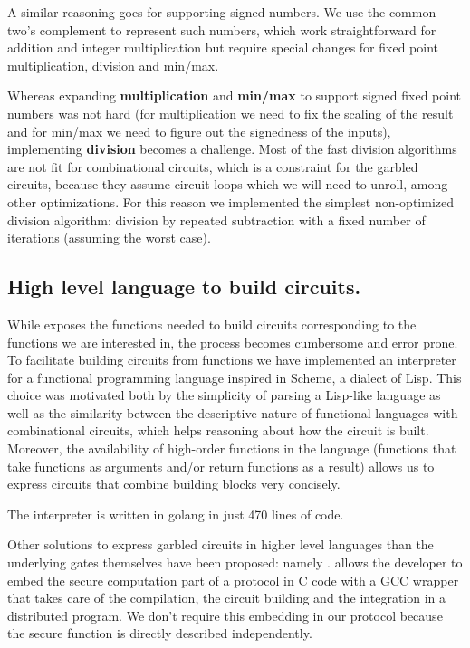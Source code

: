 A similar reasoning goes for supporting signed numbers.  We use the common
two's complement to represent such numbers, which work straightforward for
addition and integer multiplication but require special changes for fixed point
multiplication, division and min/max.

Whereas expanding \textbf{multiplication} and \textbf{min/max} to support
signed fixed point numbers was not hard (for multiplication we need to fix the
scaling of the result and for min/max we need to figure out the signedness of
the inputs), implementing \textbf{division} becomes a challenge.  Most of the
fast division algorithms are not fit for combinational circuits, which is a
constraint for the garbled circuits, because they assume circuit loops which we
will need to unroll, among other optimizations.  For this reason we implemented
the simplest non-optimized division algorithm: division by repeated subtraction
with a fixed number of iterations (assuming the worst case).

\subsection{High level language to build circuits.}

While \libgarble{} exposes the functions needed to build circuits corresponding
to the functions we are interested in, the process becomes cumbersome and error
prone.  To facilitate building circuits from functions we have implemented an
interpreter for a functional programming language inspired in Scheme, a dialect
of Lisp.  This choice was motivated both by the simplicity of parsing a
Lisp-like language as well as the similarity between the descriptive nature of
functional languages with combinational circuits, which helps reasoning about
how the circuit is built.  Moreover, the availability of high-order functions
in the language (functions that take functions as arguments and/or return
functions as a result) allows us to express circuits that combine building
blocks very concisely.

The interpreter is written in golang in just 470 lines of code.

Other solutions to express garbled circuits in higher level languages than the
underlying gates themselves have been proposed: namely \OblivC{}.  \OblivC{}
allows the developer to embed the secure computation part of a protocol in C
code with a GCC wrapper that takes care of the compilation, the circuit
building and the integration in a distributed program.  We don't require this
embedding in our protocol because the secure function is directly described
independently.

